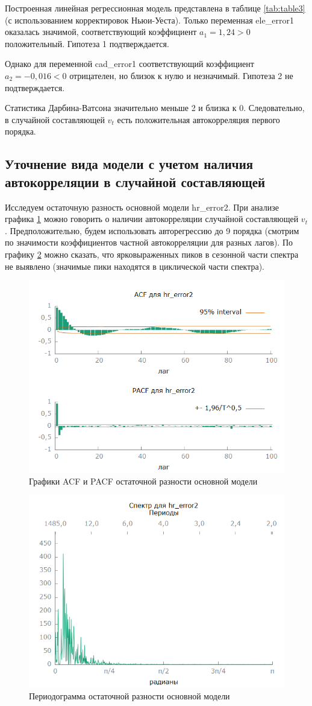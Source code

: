 \documentclass[a4paper,12pt]{article}
\begin{document}
Построенная линейная регрессионная модель представлена в таблице \ref{tab:table3} (с использованием корректировок Ньюи-Уеста). Только переменная ele\_error1 оказалась значимой, соответствующий коэффициент $a_1 = 1,24 > 0$ положительный. Гипотеза 1 подтверждается.

Однако для переменной cad\_error1 соответствующий коэффициент $a_2 = -0,016 < 0$ отрицателен, но близок к нулю и незначимый. Гипотеза 2 не подтверждается.

Статистика Дарбина-Ватсона значительно меньше 2 и близка к 0. Следовательно, в случайной составляющей $v_t$ есть положительная автокорреляция первого порядка.

\subsection{Уточнение вида модели с учетом наличия автокорреляции в случайной составляющей}
Исследуем остаточную разность основной модели hr\_error2. При анализе графика \ref{fig:hr_error2_acf_100} можно говорить о наличии автокорреляции случайной составляющей $v_t$. Предположительно, будем использовать авторегрессию до 9 порядка (смотрим по значимости коэффициентов частной автокорреляции для разных лагов). По графику \ref{fig:hr_error2_spectr} можно сказать, что ярковыраженных пиков в сезонной части спектра не выявлено (значимые пики находятся в циклической части спектра). 

\begin{figure}[H]
	\centering
	\includegraphics[width=0.5\linewidth]{../[graphics]/hr_error2_acf_100.png}
	\caption{Графики ACF и PACF остаточной разности основной модели}
	\label{fig:hr_error2_acf_100}
\end{figure}

\begin{figure}[H]
	\centering
	\includegraphics[width=0.5\linewidth]{../[graphics]/hr_error2_spectr.png}
	\caption{Периодограмма остаточной разности основной модели}
	\label{fig:hr_error2_spectr}
\end{figure}
\end{document}
